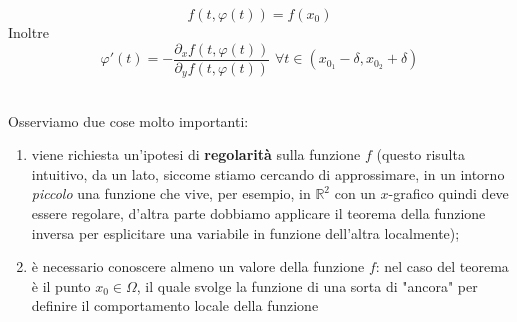 \begin{theorem}
\begin{theorem}
$$
f(t, \varphi(t)) = f(x_0)
$$
Inoltre
$$
\varphi'(t)=-\frac{\partial_x f(t, \varphi(t))}{\partial_y f(t, \varphi(t))} \, \, \forall t \in (x_{0_1} - \delta, x_{0_2} + \delta)
$$
\end{theorem}
\hspace{1cm} \\
Osserviamo due cose molto importanti:
\begin{enumerate}[label=\protect\circled{\arabic*}]
	\item viene richiesta un'ipotesi di \textbf{regolarità} sulla funzione $f$ (questo risulta intuitivo, da un lato, siccome stiamo cercando di approssimare, in un intorno \emph{piccolo} una funzione che vive, per esempio, in $\mathbb{R}^2$ con un $x$-grafico quindi deve essere regolare, d'altra parte dobbiamo applicare il teorema della funzione inversa per esplicitare una variabile in funzione dell'altra localmente);
	\item è necessario conoscere almeno un valore della funzione $f$: nel caso del teorema è il punto $x_0 \in \Omega$, il quale svolge la funzione di una sorta di "ancora" per definire il comportamento locale della funzione
\end{enumerate}
\end{theorem}
